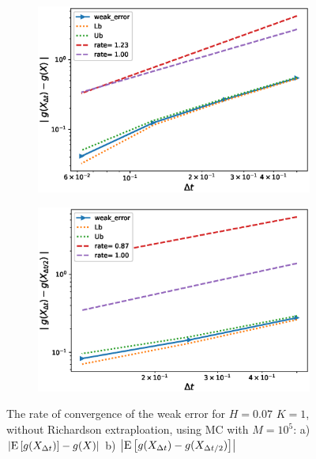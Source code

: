 \documentclass[11pt]{article}
\newcommand{\expt}[1]{\mathrm{E}\left[#1\right]}
\begin{document}
\begin{figure}
	\centering
	\begin{subfigure}{.4\textwidth}
		\centering
		\includegraphics[width=1\linewidth]{./figures/rBergomi_weak_error_rates/with_change_measure/without_rich/H_007/weak_convergence_order_Bergomi_H_007_K_1_M_10_5_CI_relative_measure_change_spec}
		\caption{}
		\label{fig:sub3}
	\end{subfigure}%
	\begin{subfigure}{.4\textwidth}
		\centering
		\includegraphics[width=1\linewidth]{./figures/rBergomi_weak_error_rates/with_change_measure/without_rich/H_007/weak_convergence_order_differences_Bergomi_H_007_K_1_M_10_5_CI_relative_measure_change_spec}
		\caption{}
		\label{fig:sub4}
	\end{subfigure}
	
	\caption{The rate of convergence of the weak error for $H=0.07$ $K=1$, without Richardson extraploation, using MC with $M=10^5$: a) $\abs{\expt{g(X_{\Delta t})}-g(X)}$  b) $\abs{\expt{g(X_{\Delta t})-g(X_{\Delta t/2})}}$ }
	\label{fig:Weak_rate_H_007_without_rich_change_meausre}
\end{figure}
\end{document}
